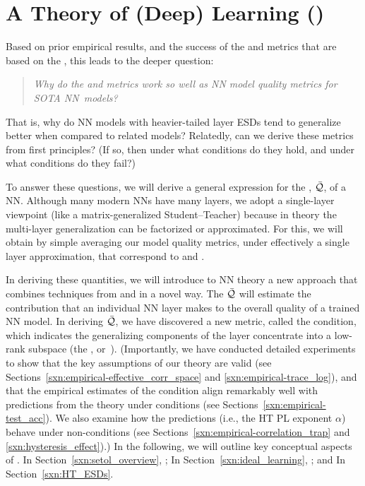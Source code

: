 \section{A \SemiEmpirical Theory of (Deep) Learning (\SETOL)}
\label{sxn:setol}

Based on prior empirical results, and the success of the \ALPHA and \ALPHAHAT metrics that are based on the \HTSR \Phenomenology, this leads to the deeper question: 
%
\begin{quote}
\emph{Why do the \ALPHA and \ALPHAHAT metrics work so well as NN model quality metrics for SOTA NN~models?}
\end{quote}
That is, why do NN models with heavier-tailed layer ESDs tend to generalize better when compared to related models?
Relatedly, can we derive these metrics from first principles?
(If so, then under what conditions do they hold, and under what conditions do they fail?)


\noindent
To answer these questions, we will derive a general expression for the \LayerQuality, $\bar{\mathcal{Q}}$, of a NN.
Although many modern NNs have many layers, we adopt a single-layer viewpoint (like a matrix-generalized Student–Teacher) because in \SMOG theory the multi-layer generalization can be factorized or approximated.
For this, we will obtain by simple averaging our model quality metrics, under effectively a single layer approximation, that correspond to \ALPHA and \ALPHAHAT.


In deriving these quantities, we will introduce to NN theory a new \SemiEmpirical approach that combines techniques from \STATMECH and \RMT in a novel way.
The \LayerQuality $\bar{\mathcal{Q}}$ will estimate the contribution that an individual NN layer makes to the overall quality of a trained NN model.
In deriving $\bar{\mathcal{Q}}$, we have discovered a new \LayerQuality metric, called the \TRACELOG condition,
which indicates the generalizing components of the layer concentrate into a low-rank subspace
(the \emph{\EffectiveCorrelationSpace}, or~\ECS).
%
(Importantly, we have conducted detailed experiments to show that the key assumptions of our \SETOL theory are valid
(see Sections~\ref{sxn:empirical-effective_corr_space} and \ref{sxn:empirical-trace_log}),
and that the empirical estimates of the \SETOL \TRACELOG condition align remarkably well with predictions from the \HTSR
theory under \Ideal conditions (see Sections~\ref{sxn:empirical-test_acc}).
We also examine how the \HTSR predictions (i.e., the HT PL exponent $\alpha$) behave under non-\Ideal conditions (see Sections~\ref{sxn:empirical-correlation_trap} and \ref{sxn:hysteresis_effect}).)
%
In the following, we will outline key conceptual aspects of \SETOL.
In Section~\ref{sxn:setol_overview}, ;
In Section~\ref{sxn:ideal_learning}, ; and
In Section~\ref{sxn:HT_ESDs}.






